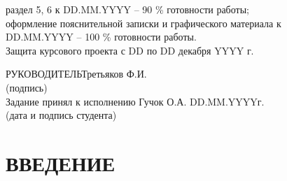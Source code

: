 \documentclass[14pt,a4paper]{extreport}
\begin{document}
\begin{enumerate}
	\underline{\hspace*{16cm}}\hspace*{-16cm}раздел 5, 6 к DD.MM.YYYY  –  90 \% готовности работы;\\
	\underline{\hspace*{16cm}}\hspace*{-16cm}оформление пояснительной записки и графического материала к\\
	\underline{\hspace*{16cm}}\hspace*{-16cm}DD.MM.YYYY – 100 \% готовности работы.\\
	\underline{\hspace*{16cm}}\hspace*{-16cm}Защита курсового проекта с DD по DD декабря YYYY г.\\
	\end{enumerate}
	\hspace*{7cm}РУКОВОДИТЕЛЬ\underline{\hspace*{6cm}}\hspace*{-3.9cm}Третьяков Ф.И.\\
	\hspace*{11.5cm}\small (подпись) \normalsize\\
	\bigskip
	Задание принял к исполнению \underline{\hspace*{10.5cm}}\hspace*{-8cm}Гучок О.А. DD.MM.YYYYг.\\
	\hspace*{7cm}\small (дата и подпись студента) \normalsize\\
	\newpage
	\pagestyle{plain}
	
	\renewcommand\contentsname{\center\normalsize \textbf{СОДЕРЖАНИЕ} \endcenter}
	\tableofcontents
	\endcenter
	\newpage
	\section*{\center\normalsize ВВЕДЕНИЕ \endcenter}
	\hspace{4ex}
	
\end{document}
